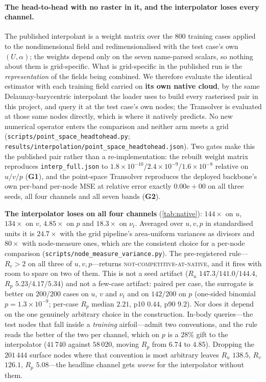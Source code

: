 \paragraph{The head-to-head with no raster in it, and the interpolator loses every
channel.} The published interpolant is a weight matrix over the $800$ training cases
applied to the nondimensional field and redimensionalised with the test case's own
$(U,\alpha)$; the weights depend only on the seven name-parsed scalars, so nothing about
them is grid-specific. What is grid-specific in the published run is the
\emph{representation} of the fields being combined. We therefore evaluate the identical
estimator with each training field carried on \textbf{its own native cloud}, by the same
Delaunay-barycentric interpolant the loader uses to build every rasterised pair in this
project, and query it at the test case's own nodes; the Transolver is evaluated at those
same nodes directly, which is where it natively predicts. No new numerical operator enters
the comparison and neither arm meets a grid
(\texttt{scripts\slash{}point\_space\_headtohead.py};
\texttt{results\slash{}interpolation\slash{}point\_space\_headtohead.json}). Two gates make this the
published pair rather than a re-implementation: the rebuilt weight matrix reproduces
\texttt{interp\_full.json} to $1.8\times10^{-10}$/$2.4\times10^{-9}$/$1.6\times10^{-8}$
relative on $u/v/p$ (\textbf{G1}), and the point-space Transolver reproduces the deployed
backbone's own per-band per-node MSE at relative error exactly $0.00\mathrm{e}{+}00$ on all
three seeds, all four channels and all seven bands (\textbf{G2}).

\textbf{The interpolator loses on all four channels} (\autoref{tab:native}):
$144\times$ on $u$, $134\times$ on $v$, $4.85\times$ on $p$ and $18.3\times$ on $\nu_t$.
Averaged over $u,v,p$ in standardised units it is $24.7\times$ with the grid pipeline's
area-uniform variances as divisors and $80\times$ with node-measure ones, which are the
consistent choice for a per-node comparison (\texttt{scripts\slash{}node\_measure\_variance.py}). The pre-registered rule---$R_c>2$ on
all three of $u,v,p$---returns \textsc{not-competitive-at-native}, and it fires with room
to spare on two of them. This is not a seed artifact ($R_u$ $147.3/141.0/144.4$, $R_p$
$5.23/4.17/5.34$) and not a few-case artifact: paired per case, the surrogate is better on
$200/200$ cases on $u$, $v$ and $\nu_t$ and on $142/200$ on $p$ (one-sided binomial
$p=1.3\times10^{-9}$; per-case $R_p$ median $2.21$, p10 $0.44$, p90 $9.2$). Nor does it
depend on the one genuinely arbitrary choice in the construction. In-body queries---the
test nodes that fall inside a \emph{training} airfoil---admit two conventions, and the rule
reads the better of the two per channel, which on $p$ is a $28\%$ gift to the interpolator
($41\,740$ against $58\,020$, moving $R_p$ from $6.74$ to $4.85$). Dropping the $201\,444$
surface nodes where that convention is most arbitrary leaves $R_u$ $138.5$, $R_v$ $126.1$,
$R_p$ $\mathbf{5.08}$---the headline channel gets \emph{worse} for the interpolator
without them.

